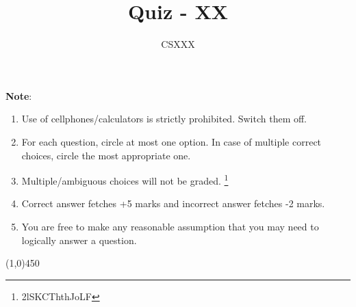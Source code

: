\documentclass[10pt, letterpaper]{article}
\begin{document}
\title{Quiz - XX}
\author{CSXXX}
\date{}

\maketitle
\vspace{-0.25in}


\textbf{Note}:
\begin{enumerate}
\item Use of cellphones/calculators is strictly prohibited. Switch them off.  
\item For each question, circle at most one option. In case of multiple correct choices, circle the most appropriate one.
\item Multiple/ambiguous choices will not be graded. {\let\thefootnote\relax\footnote{2lSKCThthJoLF}}
\item Correct answer fetches +5 marks and incorrect answer fetches -2 marks.
\item You are free to make any reasonable assumption that you may need to logically answer a question.
\end{enumerate}
\vspace{-0.25in}
\begin{center}
\line(1,0){450}
\end{center}
\end{document}

